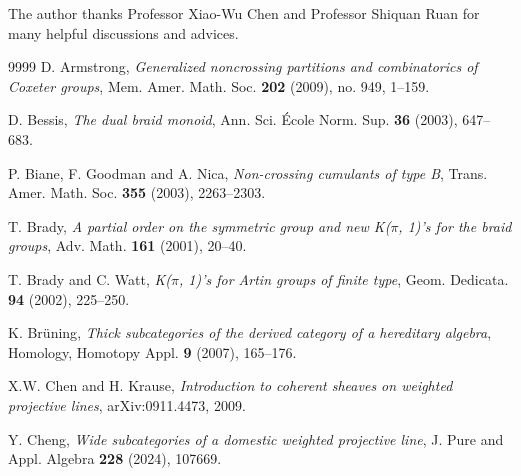 \documentclass[a4paper, 11pt, reqno]{amsart}
\numberwithin{equation}{section}
\theoremstyle{remark}
\theoremstyle{definition}
\begin{document}
The author thanks Professor Xiao-Wu Chen and Professor Shiquan Ruan for many helpful discussions and advices. 









\begin{thebibliography}{9999}
    {\sc D. Armstrong}, {\em Generalized noncrossing partitions and combinatorics of {C}oxeter groups}, Mem. Amer. Math. Soc. {\bf 202} (2009), no. 949, 1--159.

    {\sc D. Bessis}, {\em The dual braid monoid}, Ann. Sci. {\' E}cole Norm. Sup. {\bf 36} (2003), 647--683.

    {\sc P. Biane, F. Goodman and A. Nica}, {\em Non-crossing cumulants of type B}, Trans. Amer. Math. Soc. {\bf 355} (2003), 2263--2303.



    {\sc T. Brady}, {\em A partial order on the symmetric group and new {K}($\pi$, 1)'s for the braid groups}, Adv. Math. {\bf 161} (2001), 20--40.

    {\sc T. Brady and C. Watt}, {\em K($\pi$, 1)'s for {A}rtin groups of finite type}, Geom. Dedicata. {\bf 94} (2002), 225--250.
   
    {\sc K. Br{\"u}ning}, {\em Thick subcategories of the derived category of a hereditary algebra}, Homology, Homotopy Appl. {\bf 9} (2007), 165--176.


    {\sc X.W. Chen and H. Krause}, {\em Introduction to coherent sheaves on weighted projective lines}, arXiv:0911.4473, 2009.

    {\sc Y. Cheng}, {\em Wide subcategories of a domestic weighted projective line}, J. Pure and Appl. Algebra {\bf 228} (2024), 107669.


\end{thebibliography}
\end{document}
